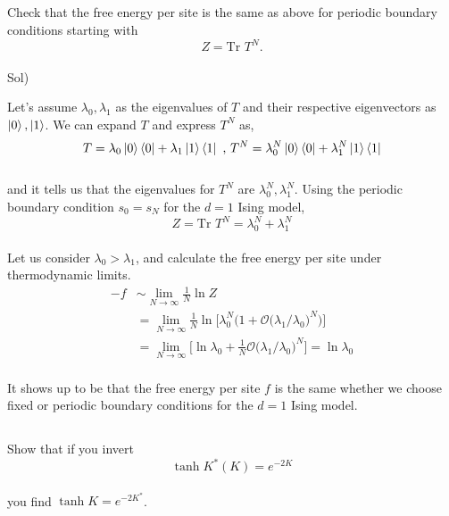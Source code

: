 \documentclass[paper=a4, fontsize=11pt]{scrartcl}
\numberwithin{equation}{section}
\numberwithin{figure}{section}
\numberwithin{table}{section}
\newcommand{\tr}{\text{Tr }}
\newenvironment{problem}{\subsection{}}{}
\newenvironment{solution}{Sol) \begin{adjustwidth}{0.2in}{}\vspace{0.1in}}{\end{adjustwidth}}
\begin{document}
\begin{problem}
	Check that the free energy per site is the same as above for periodic boundary conditions starting with\\
	\begin{equation}
		Z= \tr T^N.
	\end{equation}
\end{problem}\\
\begin{solution}
	Let's assume $\lambda_0, \lambda_1$ as the eigenvalues of $T$ and their respective eigenvectors as $\ket{0},\ket{1}$. We can expand $T$ and express $T^N$ as,\\[3pt]
	\begin{equation}
		T = \lambda_0 \ket{0}\bra{0}+ \lambda_1\ket{1}\bra{1} \text{ , } T^N = \lambda_0^N \ket{0}\bra{0}+ \lambda_1^N \ket{1}\bra{1}
	\end{equation}\\[3pt]
	and it tells us that the eigenvalues for $T^N$ are $\lambda_0^N,\lambda_1^N$. Using the periodic boundary condition $s_0 = s_N$ for the $d=1$ Ising model, \\[3pt]
	\begin{equation}
		Z=\tr T^N = \lambda_0^N + \lambda_1^N 
	\end{equation}\\[3pt]
	Let us consider $\lambda_0 > \lambda_1$, and calculate the free energy per site under thermodynamic limits.\\[3pt]
	\begin{equation}
	\begin{split}
			-f &\sim \lim_{N\to\infty} \frac{1}{N} \ln Z \\
			&= \lim_{N\to\infty} \frac{1}{N} \ln \bigg[ \lambda_0^N \bigg( 1 + \mathcal{O}\big(\lambda_1 /\lambda_0\big)^N\bigg)\bigg] \\
			&= \lim_{N\to\infty} \bigg[\ln \lambda_0 + \frac{1}{N} \mathcal{O}\big(\lambda_1 /\lambda_0\big)^N \bigg] = \ln \lambda_0 
	\end{split}
	\end{equation}\\[3pt]
	It shows up to be that the free energy per site $f$ is the same whether we choose fixed or periodic boundary conditions for the $d=1$ Ising model.
\end{solution}

\vskip 0.3in

\begin{problem}
	Show that if you invert\\
	\begin{equation}
		\tanh K^* ( K ) = e^{-2K}
	\end{equation}\\
	you find $\tanh K = e^{-2K^{*}}$.
\end{problem}\\
\end{document}
